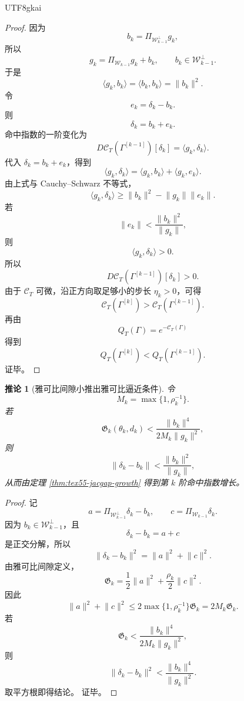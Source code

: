 \documentclass[12pt]{article}
\newtheorem{corollary}{推论}[section]
\begin{document}
\begin{CJK*}{UTF8}{gkai}
\begin{proof}
因为
\[
  b_k
  =
  \Pi_{\mathcal W_{k-1}^{\perp}}g_k,
\]
所以
\[
  g_k
  =
  \Pi_{\mathcal W_{k-1}}g_k+b_k,
  \qquad
  b_k\in\mathcal W_{k-1}^{\perp}.
\]
于是
\[
  \langle g_k,b_k\rangle
  =
  \langle b_k,b_k\rangle
  =
  \lVert b_k\rVert^2.
\]
令
\[
  e_k=\delta_k-b_k.
\]
则
\[
  \delta_k=b_k+e_k.
\]
命中指数的一阶变化为
\[
  D\mathcal C_T(\Gamma^{[k-1]})[\delta_k]
  =
  \langle g_k,\delta_k\rangle.
\]
代入 \(\delta_k=b_k+e_k\)，得到
\[
  \langle g_k,\delta_k\rangle
  =
  \langle g_k,b_k\rangle+\langle g_k,e_k\rangle.
\]
由上式与 Cauchy--Schwarz 不等式，
\[
  \langle g_k,\delta_k\rangle
  \ge
  \lVert b_k\rVert^2-\lVert g_k\rVert\lVert e_k\rVert.
\]
若
\[
  \lVert e_k\rVert
  <
  \frac{\lVert b_k\rVert^2}{\lVert g_k\rVert},
\]
则
\[
  \langle g_k,\delta_k\rangle>0.
\]
所以
\[
  D\mathcal C_T(\Gamma^{[k-1]})[\delta_k]>0.
\]
由于 \(\mathcal C_T\) 可微，沿正方向取足够小的步长 \(\eta_k>0\)，可得
\[
  \mathcal C_T(\Gamma^{[k]})
  >
  \mathcal C_T(\Gamma^{[k-1]}).
\]
再由
\[
  Q_T(\Gamma)=e^{-\mathcal C_T(\Gamma)}
\]
得到
\[
  Q_T(\Gamma^{[k]})
  <
  Q_T(\Gamma^{[k-1]}).
\]
证毕。
\end{proof}

\begin{corollary}[雅可比间隙小推出雅可比逼近条件]
\label{cor:tex55-jacgap-small-gap-implies-growth}
令
\[
  M_k=\max\{1,\rho_k^{-1}\}.
\]
若
\[
  \mathfrak G_k(\theta_k,d_k)
  <
  \frac{\lVert b_k\rVert^4}{2M_k\lVert g_k\rVert^2},
\]
则
\[
  \lVert\delta_k-b_k\rVert
  <
  \frac{\lVert b_k\rVert^2}{\lVert g_k\rVert},
\]
从而由定理 \ref{thm:tex55-jacgap-growth} 得到第 \(k\) 阶命中指数增长。
\end{corollary}

\begin{proof}
记
\[
  a=
  \Pi_{\mathcal W_{k-1}^{\perp}}\delta_k-b_k,
  \qquad
  c=
  \Pi_{\mathcal W_{k-1}}\delta_k.
\]
因为 \(b_k\in\mathcal W_{k-1}^\perp\)，且
\[
  \delta_k-b_k=a+c
\]
是正交分解，所以
\[
  \lVert\delta_k-b_k\rVert^2
  =
  \lVert a\rVert^2+\lVert c\rVert^2.
\]
由雅可比间隙定义，
\[
  \mathfrak G_k
  =
  \frac12\lVert a\rVert^2
  +
  \frac{\rho_k}{2}\lVert c\rVert^2.
\]
因此
\[
  \lVert a\rVert^2+\lVert c\rVert^2
  \le
  2\max\{1,\rho_k^{-1}\}\mathfrak G_k
  =
  2M_k\mathfrak G_k.
\]
若
\[
  \mathfrak G_k
  <
  \frac{\lVert b_k\rVert^4}{2M_k\lVert g_k\rVert^2},
\]
则
\[
  \lVert\delta_k-b_k\rVert^2
  <
  \frac{\lVert b_k\rVert^4}{\lVert g_k\rVert^2}.
\]
取平方根即得结论。
证毕。
\end{proof}


\end{CJK*}
\end{document}
